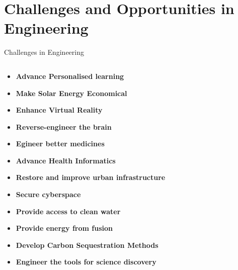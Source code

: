 \section{Challenges and Opportunities in Engineering}

{
\begin{frame}{Challenges in Engineering}
  \begin{columns}
    \begin{column}{.6\linewidth}
    \begin{itemize}
    \item \textbf{Advance Personalised learning}
    \item \textbf{Make Solar Energy Economical}
    \item \textbf{Enhance Virtual Reality}
    \item \textbf{Reverse-engineer the brain}
    \item \textbf{Egineer better medicines}
    \item \textbf{Advance Health Informatics}
    \item \textbf{Restore and improve urban infrastructure}
    \item \textbf{Secure cyberspace}
    \item \textbf{Provide access to clean water}
    \item \textbf{Provide energy from fusion}
    \item \textbf{Develop Carbon Sequestration Methods}
    \item \textbf{Engineer the tools for science discovery}
    \end{itemize}
  \end{column}


\end{columns}
\end{frame}}
